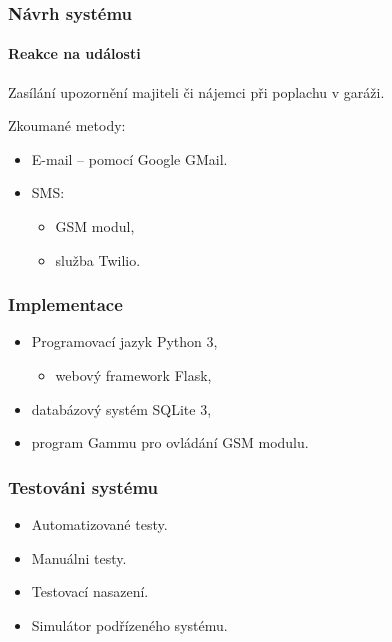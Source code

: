 \documentclass{beamer}
\begin{document}
  \begin{frame}
    \frametitle{Návrh systému}
    \framesubtitle{Reakce na události}

    Zasílání upozornění majiteli či nájemci při poplachu v garáži.

    Zkoumané metody:

    \begin{itemize}
      \item E-mail -- pomocí Google GMail.
      \item SMS:
      \begin{itemize}
        \item GSM modul,
        \item služba Twilio. 
      \end{itemize}
    \end{itemize}


  \end{frame}

  \begin{frame}
    \frametitle{Implementace}

    \begin{itemize}
      \item Programovací jazyk Python 3,
      \begin{itemize}
        \item webový framework Flask,
      \end{itemize}
      \item databázový systém SQLite 3,
      \item program Gammu pro ovládání GSM modulu.
    \end{itemize}


  \end{frame}

  \begin{frame}
    \frametitle{Testováni systému}

    \begin{itemize}
      \item Automatizované testy. %
      \item Manuálni testy. %
      \item Testovací nasazení.
      \item Simulátor podřízeného systému.
    \end{itemize}

  \end{frame}
\end{document}
